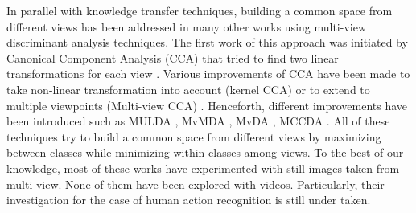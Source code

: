 
        In parallel with knowledge transfer techniques, building a common space from different views has been addressed in many other works using multi-view discriminant analysis techniques. The first work of this approach was initiated by Canonical Component Analysis (CCA) that tried to find two linear transformations for each view \cite{thompson1984canonical}. Various improvements of CCA have been made to take non-linear transformation into account (kernel CCA) or to extend to multiple viewpoints (Multi-view CCA) \cite{hardoon2004canonical}. %
        Henceforth, different improvements have been introduced such as MULDA \cite{yang2014multi}, MvMDA \cite{you2019multi}, MvDA \cite{kan2015multi}, MCCDA \cite{you2019multi}. All of these techniques try to build a common space from different views by maximizing between-classes while minimizing within classes among views. To the best of our knowledge, most of these works have experimented with still images taken from multi-view. None of them have been explored with videos. Particularly, their investigation for the case of human action recognition is still under taken.


